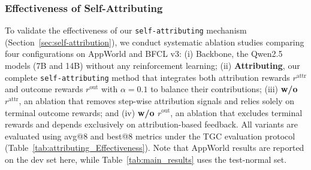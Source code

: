 \subsubsection{Effectiveness of Self-Attributing} 
\label{sec:attr_effectiveness}
To validate the effectiveness of our \texttt{self-attributing} mechanism (Section~\ref{sec:self-attribution}), we conduct systematic ablation studies comparing four configurations on AppWorld and BFCL v3: (i) Backbone, the Qwen2.5 models (7B and 14B) without any reinforcement learning; (ii) \textbf{Attributing}, our complete \texttt{self-attributing} method that integrates both attribution rewards $r^{\text{attr}}$ and outcome rewards $r^{\text{out}}$ with $\alpha{=}0.1$ to balance their contributions; (iii) \textbf{w/o $r^{\text{attr}}$}, an ablation that removes step-wise attribution signals and relies solely on terminal outcome rewards; and (iv) \textbf{w/o $r^{\text{out}}$}, an ablation that excludes terminal rewards and depends exclusively on attribution-based feedback. All variants are evaluated using avg@8 and best@8 metrics under the TGC evaluation protocol (Table~\ref{tab:attributing_Effectiveness}).  Note that AppWorld results are reported on the dev set here, while Table~\ref{tab:main_results} uses the test-normal set.

